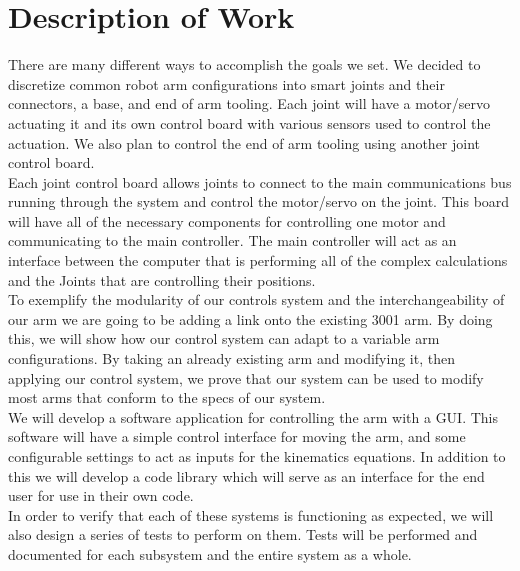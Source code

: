 \section{Description of Work}

There are many different ways to accomplish the goals we set. We decided to discretize common robot arm configurations into smart joints and their connectors, a base, and end of arm tooling.  Each joint will have a motor/servo actuating it and its own control board with various sensors used to control the actuation.  We also plan to control the end of arm tooling using another joint control board.  \\
\newline
Each joint control board allows joints to connect to the main communications bus running through the system and control the motor/servo on the joint. This board will have all of the necessary components for controlling one motor and communicating to the main controller. The main controller will act as an interface between the computer that is performing all of the complex calculations and the Joints that are controlling their positions. \\
\newline
To exemplify the modularity of our controls system and the interchangeability of our arm we are going to be adding a link onto the existing 3001 arm. By doing this, we will show how our control system can adapt to a variable arm configurations. By taking an already existing arm and modifying it, then applying our control system, we prove that our system can be used to modify most arms that conform to the specs of our system.  \\
\newline
We will develop a software application for controlling the arm with a GUI. This software will have a simple control interface for moving the arm, and some configurable settings to act as inputs for the kinematics equations. In addition to this we will develop a code library which will serve as an interface for the end user for use in their own code. \\
\newline
In order to verify that each of these systems is functioning as expected, we will also design a series of tests to perform on them. Tests will be performed and documented for each subsystem and the entire system as a whole.
